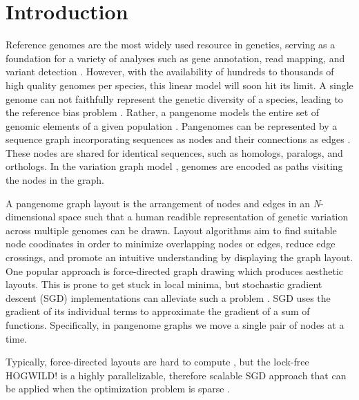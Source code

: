 \documentclass{bioinfo}
\theoremstyle{definition}
\begin{document}
	\section{Introduction}
	Reference genomes are the most widely used resource in genetics, serving as a foundation for a variety of analyses
	such as gene annotation, read mapping, and variant detection \citep{Singh2022}.
	However, with the availability of hundreds to thousands of high quality genomes per species, this linear model will soon hit its limit.
	A single genome can not faithfully represent the genetic diversity of a species, leading to the reference bias problem \citep{Ballouz2019}.
	Rather, a pangenome models the entire set of genomic elements of a given population \citep{Tettelin_2008,cpang2018,Eizenga_2020, Sherman_2020}.
	Pangenomes can be represented by a sequence graph incorporating sequences as nodes and their connections as edges \citep{Hein1989}.
	These nodes are shared for identical sequences, such as homologs, paralogs, and orthologs.
	In the variation graph model \citep{Garrison:2018}, genomes are encoded as paths visiting the nodes in the graph.
	
	A pangenome graph layout is the arrangement of nodes and edges in an \textit{N}-dimensional space such that a human readible representation of genetic variation across multiple genomes can be drawn. 
	Layout algorithms aim to find suitable node coodinates in order to minimize overlapping nodes or edges, reduce edge crossings, and promote an intuitive understanding by displaying the graph layout.
	One popular approach is force-directed graph drawing \citep{cheong_force-directed_2022} which produces aesthetic layouts.
	This is prone to get stuck in local minima, but stochastic gradient descent (SGD) implementations can alleviate such a problem \citep{Zheng2019}.
	SGD uses the gradient of its individual terms to approximate the gradient of a sum of functions. Specifically, in pangenome graphs we move a single pair of nodes at a time.
	
	Typically, force-directed layouts are hard to compute \citep{wang_research_2014}, but the lock-free HOGWILD! is a highly parallelizable, therefore scalable SGD approach that can be applied when the optimization problem is sparse \citep{Recht2011}.
	
\end{document}
